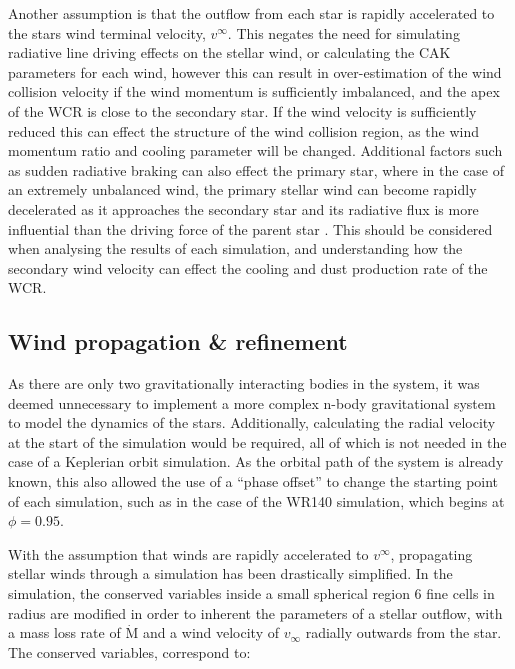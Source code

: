Another assumption is that the outflow from each star is rapidly accelerated to the stars wind terminal velocity, $v^\infty$.
This negates the need for simulating radiative line driving effects on the stellar wind, or calculating the CAK parameters for each wind, however this can result in over-estimation of the wind collision velocity if the wind momentum is sufficiently imbalanced, and the apex of the WCR is close to the secondary star.
If the wind velocity is sufficiently reduced this can effect the structure of the wind collision region, as the wind momentum ratio and cooling parameter will be changed.
Additional factors such as sudden radiative braking can also effect the primary star, where in the case of an extremely unbalanced wind, the primary stellar wind can become rapidly decelerated as it approaches the secondary star and its radiative flux is more influential than the driving force of the parent star \parencite{gayley_sudden_1997}.
This should be considered when analysing the results of each simulation, and understanding how the secondary wind velocity can effect the cooling and dust production rate of the WCR.



\subsection{Wind propagation \& refinement}


As there are only two gravitationally interacting bodies in the system, it was deemed unnecessary to implement a more complex n-body gravitational system to model the dynamics of the stars.
Additionally, calculating the radial velocity at the start of the simulation would be required, all of which is not needed in the case of a Keplerian orbit simulation.
As the orbital path of the system is already known, this also allowed the use of a ``phase offset'' to change the starting point of each simulation, such as in the case of the WR140 simulation, which begins at $\phi = 0.95$.

With the assumption that winds are rapidly accelerated to $v^\infty$, propagating stellar winds through a simulation has been drastically simplified.
In the simulation, the conserved variables inside a small spherical region 6 fine cells in radius are modified in order to inherent the parameters of a stellar outflow, with a mass loss rate of $\dot{\text{M}}$ and a wind velocity of $v_\infty$ radially outwards from the star.
The conserved variables, correspond to:

